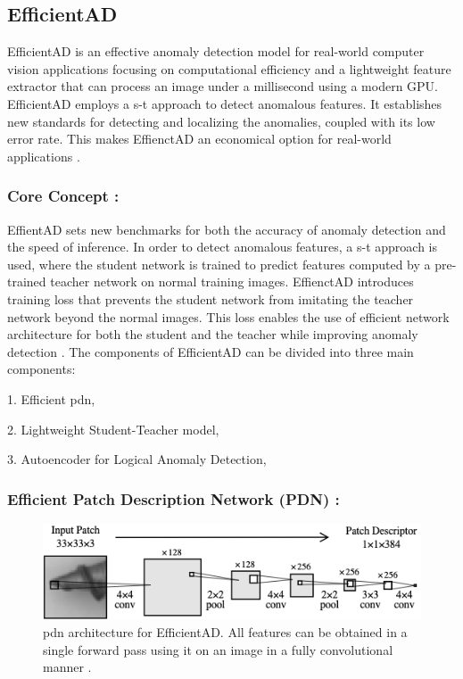 \subsection{EfficientAD}
\label{subsec:efficientad}

EfficientAD is an effective anomaly detection model for real-world computer vision applications focusing on computational efficiency and a lightweight feature extractor that can process an image under a millisecond using a modern GPU. EfficientAD employs a \gls{s-t} approach to detect anomalous features. It establishes new standards for detecting and localizing the anomalies, coupled with its low error rate. This makes EffienctAD an economical option for real-world applications \cite{batzner2024efficientadaccuratevisualanomaly}.

\subsubsection*{Core Concept :}

EffientAD sets new benchmarks for both the accuracy of anomaly detection and the speed of inference. In order to detect anomalous features, a \gls{s-t} approach is used, where the student network is trained to predict features computed by a pre-trained teacher network on normal training images. EffienctAD introduces training loss that prevents the student network from imitating the teacher network beyond the normal images. This loss enables the use of efficient network architecture for both the student and the teacher while improving anomaly detection \cite{batzner2024efficientadaccuratevisualanomaly}. The components of EfficientAD can be divided into three main components:

1. Efficient \gls{pdn},

2. Lightweight Student-Teacher model,

3. Autoencoder for Logical Anomaly Detection,

\subsubsection*{Efficient Patch Description Network (PDN) :}

\begin{figure}[ht!]
    \centering
    \includegraphics[width=1\linewidth]{Rohit_Master_Thesis//Images/pdn.png}
    \caption{\gls{pdn} architecture for EfficientAD. All features can be obtained in a single forward pass using it on an image in a fully convolutional manner \cite{batzner2024efficientadaccuratevisualanomaly}.}
    \label{fig:pdn architecture}
\end{figure}

